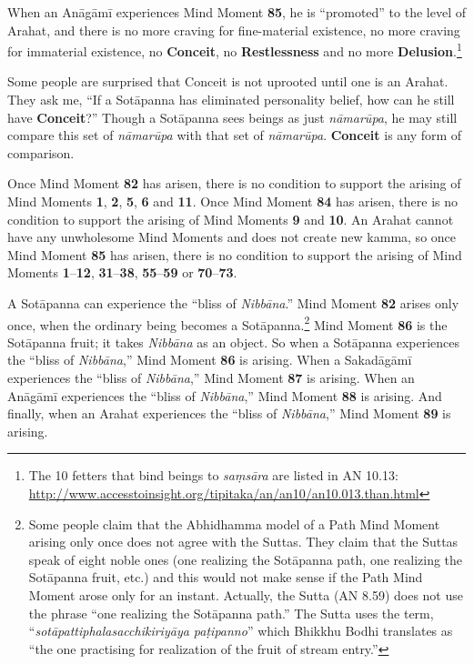 When an Anāgāmī experiences Mind Moment \textbf{85}, he is “promoted” to the level of Arahat, and there is no more craving for fine-material existence, no more craving for immaterial existence, no \textbf{Conceit}, no \textbf{Restlessness} and no more \textbf{Delusion}.\footnote{The 10 fetters that bind beings to \textit{saṃsāra} are listed in AN 10.13: \url{http://www.accesstoinsight.org/tipitaka/an/an10/an10.013.than.html}}

Some people are surprised that Conceit is not uprooted until one is an Arahat. They ask me, “If a Sotāpanna has eliminated personality belief, how can he still have \textbf{Conceit}?” Though a Sotāpanna sees beings as just \textit{nāmarūpa}, he may still compare this set of \textit{nāmarūpa} with that set of \textit{nāmarūpa}. \textbf{Conceit} is any form of comparison.

Once Mind Moment \textbf{82} has arisen, there is no condition to support the arising of Mind Moments \textbf{1}, \textbf{2}, \textbf{5}, \textbf{6} and \textbf{11}. Once Mind Moment \textbf{84} has arisen, there is no condition to support the arising of Mind Moments \textbf{9} and \textbf{10}. An Arahat cannot have any unwholesome Mind Moments and does not create new kamma, so once Mind Moment \textbf{85} has arisen, there is no condition to support the arising of Mind Moments \textbf{1}--\textbf{12}, \textbf{31}--\textbf{38}, \textbf{55}--\textbf{59} or \textbf{70}--\textbf{73}.

A Sotāpanna can experience the “bliss of \textit{Nibbāna}.” Mind Moment \textbf{82} arises only once, when the ordinary being becomes a Sotāpanna.\footnote{ Some people claim that the Abhidhamma model of a Path Mind Moment arising only once does not agree with the Suttas. They claim that the Suttas speak of eight noble ones (one realizing the Sotāpanna path, one realizing the Sotāpanna fruit, etc.) and this would not make sense if the Path Mind Moment arose only for an instant. Actually, the Sutta (AN 8.59) does not use the phrase “one realizing the Sotāpanna path.” The Sutta uses the term, “\textit{sotāpattiphalasacchikiriyāya paṭipanno}” which Bhikkhu Bodhi translates as “the one practising for realization of the fruit of stream entry.”} Mind Moment \textbf{86} is the Sotāpanna fruit; it takes \textit{Nibbāna} as an object. So when a Sotāpanna experiences the “bliss of \textit{Nibbāna},” Mind Moment \textbf{86} is arising. When a Sakadāgāmī experiences the “bliss of \textit{Nibbāna},” Mind Moment \textbf{87} is arising. When an Anāgāmī experiences the “bliss of \textit{Nibbāna},” Mind Moment \textbf{88} is arising. And finally, when an Arahat experiences the “bliss of \textit{Nibbāna},” Mind Moment \textbf{89} is arising. 

